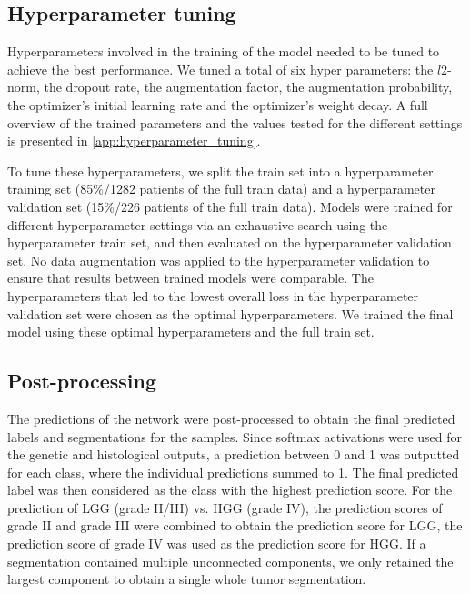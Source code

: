 \subsection{Hyperparameter tuning}\label{sec:parameter_selection}

Hyperparameters involved in the training of the model needed to be tuned to achieve the best performance.
We tuned a total of six hyper parameters: the $l2$-norm, the dropout rate, the augmentation factor, the augmentation probability, the optimizer's initial learning rate and the optimizer's weight decay.
A full overview of the trained parameters and the values tested for the different settings is presented in \cref{app:hyperparameter_tuning}.

To tune these hyperparameters, we split the train set into a hyperparameter training set (85\%/1282 patients of the full train data) and a hyperparameter validation set (15\%/226 patients of the full train data).
Models were trained for different hyperparameter settings via  an exhaustive search using the hyperparameter train set, and then evaluated on the hyperparameter validation set.
No data augmentation was applied to the hyperparameter validation to ensure that results between trained models were comparable.
The hyperparameters that led to the lowest overall loss in the hyperparameter validation set were chosen as the optimal hyperparameters.
We trained the final model using these optimal hyperparameters and the full train set.

\subsection{Post-processing}

The predictions of the network were post-processed to obtain the final predicted labels and segmentations for the samples.
Since softmax activations were used for the genetic and histological outputs, a prediction between 0 and 1 was outputted for each class, where the individual predictions summed to 1.
The final predicted label was then considered as the class with the highest prediction score.
For the prediction of \gls{LGG} (grade II/III) vs. \gls{HGG} (grade IV), the prediction scores of grade II and grade III were combined to obtain the prediction score for \gls{LGG}, the prediction score of grade IV was used as the prediction score for \gls{HGG}.
If a segmentation contained multiple unconnected components, we only retained the largest component to obtain a single whole tumor segmentation.

